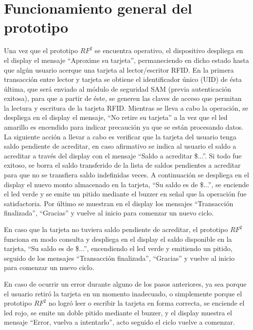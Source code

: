 \section{Funcionamiento general del prototipo}
Una vez que el prototipo $RF^{2}$ se encuentra operativo, el dispositivo despliega en el display el mensaje “Aproxime su tarjeta”, permaneciendo en dicho estado hasta que algún usuario acerque una tarjeta al lector/escritor RFID. 
En la primera transacción entre lector y tarjeta se obtiene el identificador único (UID) de ésta última, que será enviado al módulo de seguridad SAM (previa autenticación exitosa), para que a partir de éste, se generen las claves de acceso que permitan la lectura y escritura de la tarjeta RFID.
Mientras se lleva a cabo la operación, se despliega en el display el mensaje, “No retire su tarjeta” a la vez que el led amarillo es encendido para indicar precaución ya que se están procesando datos.
La siguiente acción a llevar a cabo es verificar que la tarjeta del usuario tenga saldo pendiente de acreditar, en caso afirmativo se indica al usuario el saldo a acreditar a través del display con el mensaje “Saldo a acreditar \$...”. Si todo fue exitoso, se borra el saldo transferido de la lista de saldos pendientes a acreditar para que no se transfiera saldo indefinidas veces.
A continuación se despliega en el display el nuevo monto almacenado en la tarjeta, “Su saldo es de \$...”, se enciende el led verde y se emite un pitido mediante el buzzer en señal que la operación fue satisfactoria.
Por último se muestran en el display los mensajes “Transacción finalizada”, “Gracias” y vuelve al inicio para comenzar un nuevo ciclo.

En caso que la tarjeta no tuviera saldo pendiente de acreditar, el prototipo $RF^{2}$ funciona en modo consulta y despliega en el display el saldo disponible en la tarjeta, “Su saldo es de \$...”, encendiendo el led verde y emitiendo un pitido, seguido de los mensajes “Transacción finalizada”, “Gracias” y vuelve al inicio para comenzar un nuevo ciclo.

\newpage
En caso de ocurrir un error durante alguno de los pasos anteriores, ya sea porque
el usuario retiró la tarjeta en un momento inadecuado, o simplemente porque el prototipo $RF^{2}$
no logró leer o escribir la tarjeta en forma correcta, se enciende el led rojo, se emite un
doble pitido mediante el buzzer, y el display muestra el mensaje “Error, vuelva a intentarlo”,
acto seguido el ciclo vuelve a comenzar. 

